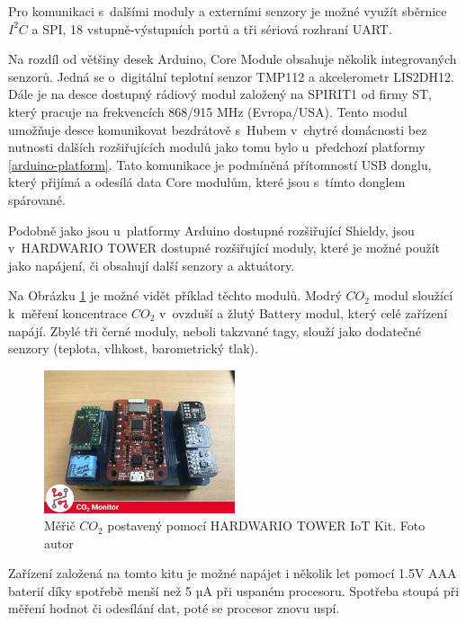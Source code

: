 Pro komunikaci s~dalšími moduly a externími senzory je možné využít sběrnice $I^2C$ a SPI, 18 vstupně-výstupních portů a tři sériová rozhraní UART. 

Na rozdíl od většiny desek Arduino, Core Module obsahuje několik integrovaných senzorů. Jedná se o~digitální teplotní senzor TMP112 a akcelerometr LIS2DH12\cite{hardwario-about-core-module}.
Dále je na desce dostupný rádiový modul založený na SPIRIT1 od firmy ST, který pracuje na frekvencích 868/915 MHz (Evropa/USA)\cite{hardwario-subghz-radio}. Tento modul umožňuje desce komunikovat bezdrátově s~Hubem v~chytré domácnosti bez nutnosti dalších rozšiřujících modulů jako tomu bylo u~předchozí platformy \ref{arduino-platform}. Tato komunikace je podmíněná přítomností USB donglu, který přijímá a odesílá data Core modulům, které jsou s~tímto donglem spárované. 

Podobně jako jsou u~platformy Arduino dostupné rozšiřující Shieldy, jsou v~HARDWARIO TOWER dostupné rozšiřující moduly, které je možné použít jako napájení, či obsahují další senzory a aktuátory. 

Na Obrázku \ref{hardwarioIotKitImage} je možné vidět příklad těchto modulů. Modrý $CO_2$ modul sloužící k~měření koncentrace $CO_2$ v~ovzduší a žlutý Battery modul, který celé zařízení napájí. Zbylé tři černé moduly, neboli takzvané tagy, slouží jako dodatečné senzory (teplota, vlhkost, barometrický tlak).

\begin{figure}[H]
	\centering
	\includegraphics[width=0.5\textwidth]{obrazky-figures/smartHomeHardware/hardwarioIoTKit.jpg}
	\caption{Měřič $CO_2$ postavený pomocí HARDWARIO TOWER IoT Kit. Foto autor}
	\label{hardwarioIotKitImage}
\end{figure}

Zařízení založená na tomto kitu je možné napájet i několik let pomocí 1.5V AAA baterií díky spotřebě menší než 5 µA při uspaném procesoru. Spotřeba stoupá při měření hodnot či odesílání dat, poté se procesor znovu uspí.

